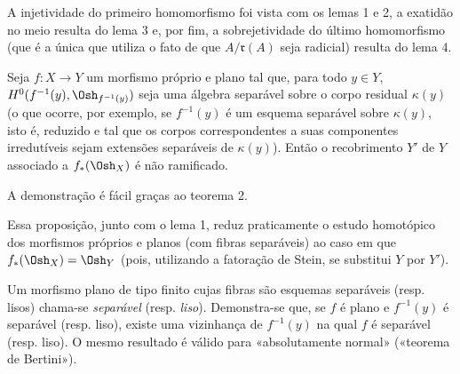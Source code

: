 A injetividade do primeiro homomorfismo foi vista com os lemas 1 e 2, a
exatidão no meio resulta do lema 3 e, por fim, a sobrejetividade do
último homomorfismo (que é a única que utiliza o fato de que
$A/\mathfrak r(A)$ seja radicial) resulta do lema 4.

 Seja $f:X\longrightarrow Y$ um morfismo próprio e plano
tal que, para todo $y\in Y$, $H^0(f^{-1}(y),\Osh_{f^{-1}(y)})$ seja uma álgebra
separável sobre o corpo residual $\kappa(y)$ (o que ocorre, por exemplo, se
$f^{-1}(y)$ é um esquema separável sobre $\kappa(y)$, isto é, reduzido e tal
que os corpos correspondentes a suas componentes irredutíveis sejam
extensões separáveis de $\kappa(y)$). Então o recobrimento $Y'$ de $Y$
associado a $f_*(\Osh_X)$ é não ramificado.

A demonstração é fácil graças ao teorema 2.

Essa proposição, junto com o lema 1, reduz praticamente o estudo
homotópico dos morfismos próprios e planos (com fibras separáveis) ao caso em
que $f_*(\Osh_X)=\Osh_Y$ (pois, utilizando a fatoração de Stein, se
substitui $Y$ por $Y'$).

 Um morfismo plano de tipo finito cujas fibras são
esquemas separáveis (resp. lisos) chama-se \emph{separável} (resp.
\emph{liso}). Demonstra-se que, se $f$ é plano e $f^{-1}(y)$ é separável
(resp. liso), existe uma vizinhança de $f^{-1}(y)$ na qual $f$ é separável
(resp. liso). O mesmo resultado é válido para «absolutamente normal»
(«teorema de Bertini»).

